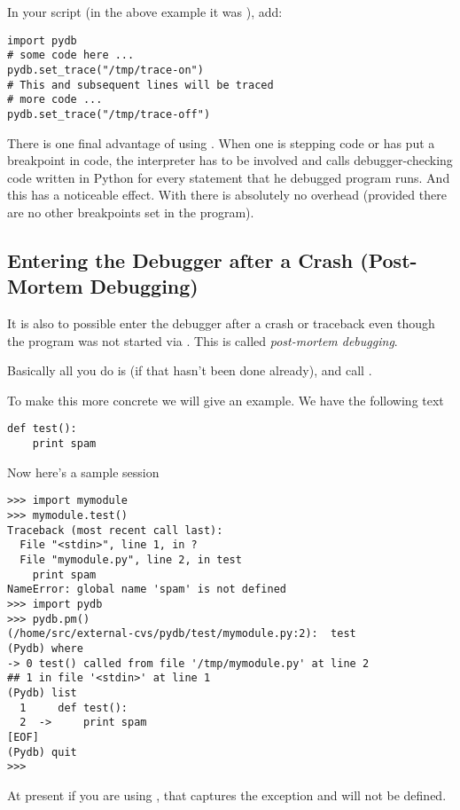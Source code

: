 In your script (in the above example it was
), add:

\begin{verbatim}
import pydb 
# some code here ...
pydb.set_trace("/tmp/trace-on")
# This and subsequent lines will be traced
# more code ...
pydb.set_trace("/tmp/trace-off")
\end{verbatim}

There is one final advantage of using .  When one is
stepping code or has put a breakpoint in code, the interpreter has to
be involved and calls debugger-checking code written in Python for
every statement that he debugged program runs. And this has a
noticeable effect. With  there is absolutely no
overhead (provided there are no other breakpoints set in the program).


\subsection{Entering the Debugger after a Crash (Post-Mortem Debugging)}\label{subsection-post-mortem}

It is also to possible enter the debugger after a crash or traceback
even though the program was not started via . This is
called \emph{post-mortem debugging}.

Basically all you do is  (if that hasn't been done
already), and call .

To make this more concrete we will give an example. We have the
following text 

\begin{verbatim}
def test():
    print spam
\end{verbatim}

Now here's a sample session

\begin{verbatim}
>>> import mymodule
>>> mymodule.test()
Traceback (most recent call last):
  File "<stdin>", line 1, in ?
  File "mymodule.py", line 2, in test
    print spam
NameError: global name 'spam' is not defined
>>> import pydb
>>> pydb.pm()
(/home/src/external-cvs/pydb/test/mymodule.py:2):  test
(Pydb) where
-> 0 test() called from file '/tmp/mymodule.py' at line 2
## 1 in file '<stdin>' at line 1
(Pydb) list
  1     def test():
  2  ->     print spam
[EOF]
(Pydb) quit
>>> 
\end{verbatim}

At present if you are using , that captures the
exception and  will not be defined.

